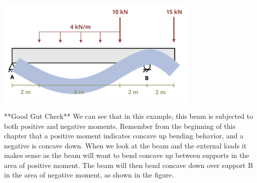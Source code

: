 \documentclass[
  letterpaper,
  DIV=11,
  numbers=noendperiod]{scrreprt}
\begin{document}
\begin{tcolorbox}
\begin{center}
\includegraphics[width=3.80208in,height=\textheight]{images/CH7 PNGs/example 7.3 part 14.png}
\end{center}

**Good Gut Check** We can see that in this example, this beam is
subjected to both positive and negative moments. Remember from the
beginning of this chapter that a positive moment indicates concave up
bending behavior, and a negative is concave down. When we look at the
beam and the external loads it makes sense as the beam will want to bend
concave up between supports in the area of positive moment. The beam
will then bend concave down over support B in the area of negative
moment, as shown in the figure.

\end{tcolorbox}
\end{document}
